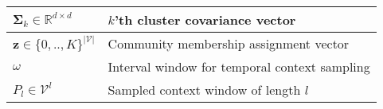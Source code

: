 \begin{table}[t]
\begin{tabular}{>{\centering\arraybackslash}m{2.1cm}|p{6cm}}
        $\boldsymbol{\Sigma}_k \in \mathbb{R}^{d\times d}$      & $k$'th cluster covariance vector              \\ \hline
        $\mathbf{z} \in \{0, .., K\}^{|\mathcal{V}|}$   & Community membership assignment vector        \\ \hline
        $\omega$                    & Interval window for temporal context sampling                     \\ \hline
        $P_l \in \mathcal{V}^l$     & Sampled context window of length $l$                              \\ \hline
    \end{tabular}
\end{table}